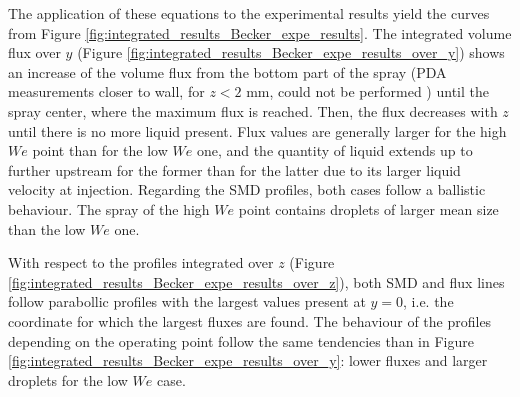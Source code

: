 %

The application of these equations to the experimental results yield the curves from Figure \ref{fig:integrated_results_Becker_expe_results}. The integrated volume flux over $y$ (Figure \ref{fig:integrated_results_Becker_expe_results_over_y}) shows an increase of the volume flux from the bottom part of the spray (PDA measurements closer to wall, for $z < 2$ mm, could not be performed ) until the spray center, where the maximum flux is reached. Then, the flux decreases with $z$ until there is no more liquid present. Flux values are generally larger for the high $We$ point than for the low $We$ one, and the quantity of liquid extends up to further upstream for the former than for the latter due to its larger liquid velocity at injection. Regarding the SMD profiles, both cases follow a ballistic behaviour. The spray of the high $We$ point contains droplets of larger mean size than the low $We$ one.

With respect to the profiles integrated over $z$ (Figure \ref{fig:integrated_results_Becker_expe_results_over_z}), both SMD and flux lines follow parabollic profiles with the largest values present at $y = 0$, i.e. the coordinate for which the largest fluxes are found. The behaviour of the profiles depending on the operating point follow the same tendencies than in Figure \ref{fig:integrated_results_Becker_expe_results_over_y}: lower fluxes and larger droplets for the low $We$ case.



